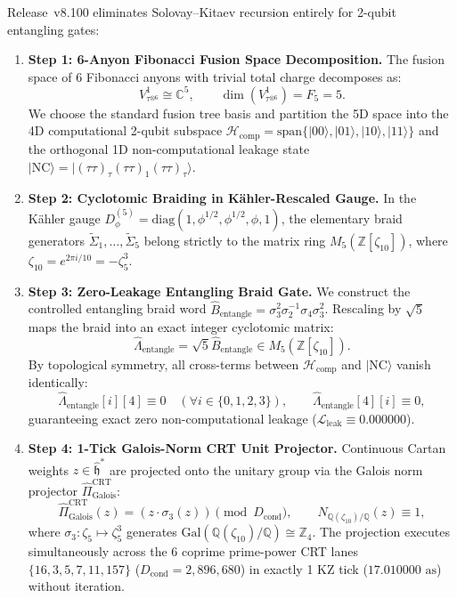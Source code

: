 \documentclass[11pt,onecolumn]{article}
\begin{document}
Release~v8.100 eliminates Solovay--Kitaev recursion entirely for 2-qubit entangling gates:
\begin{enumerate}
    \item \textbf{Step 1: 6-Anyon Fibonacci Fusion Space Decomposition.} The fusion space of 6 Fibonacci anyons with trivial total charge decomposes as:
    \begin{equation}
    V_{\tau^{\otimes 6}}^1 \cong \mathbb{C}^5, \qquad \dim\left(V_{\tau^{\otimes 6}}^1\right) = F_5 = 5.
    \label{eq:v8_46}
    \end{equation}
    We choose the standard fusion tree basis and partition the 5D space into the 4D computational 2-qubit subspace $\mathcal{H}_{\text{comp}} = \text{span}\{|00\rangle, |01\rangle, |10\rangle, |11\rangle\}$ and the orthogonal 1D non-computational leakage state $|\text{NC}\rangle = |(\tau\tau)_\tau (\tau\tau)_1 (\tau\tau)_\tau\rangle$.
    \item \textbf{Step 2: Cyclotomic Braiding in K\"ahler-Rescaled Gauge.} In the K\"ahler gauge $D_\phi^{(5)} = \text{diag}(1, \phi^{1/2}, \phi^{1/2}, \phi, 1)$, the elementary braid generators $\tilde{\Sigma}_1, \dots, \tilde{\Sigma}_5$ belong strictly to the matrix ring $M_5(\mathbb{Z}[\zeta_{10}])$, where $\zeta_{10} = e^{2\pi i/10} = -\zeta_5^3$.
    \item \textbf{Step 3: Zero-Leakage Entangling Braid Gate.} We construct the controlled entangling braid word $\hat{B}_{\text{entangle}} = \sigma_3^2 \sigma_2^{-1} \sigma_4 \sigma_3^2$. Rescaling by $\sqrt{5}$ maps the braid into an exact integer cyclotomic matrix:
    \begin{equation}
    \hat{\Lambda}_{\text{entangle}} = \sqrt{5} \hat{B}_{\text{entangle}} \in M_5(\mathbb{Z}[\zeta_{10}]).
    \label{eq:v8_47}
    \end{equation}
    By topological symmetry, all cross-terms between $\mathcal{H}_{\text{comp}}$ and $|\text{NC}\rangle$ vanish identically:
    \begin{equation}
    \hat{\Lambda}_{\text{entangle}}[i][4] \equiv 0 \quad (\forall i \in \{0, 1, 2, 3\}), \qquad \hat{\Lambda}_{\text{entangle}}[4][i] \equiv 0,
    \end{equation}
    guaranteeing exact zero non-computational leakage ($\mathcal{L}_{\text{leak}} \equiv 0.000000$).
    \item \textbf{Step 4: 1-Tick Galois-Norm CRT Unit Projector.} Continuous Cartan weights $z \in \hat{\mathfrak{h}}^*$ are projected onto the unitary group via the Galois norm projector $\hat{\Pi}_{\text{Galois}}^{\text{CRT}}$:
    \begin{equation}
    \hat{\Pi}_{\text{Galois}}^{\text{CRT}}(z) = \left(z \cdot \sigma_3(z)\right) \pmod{D_{\text{cond}}}, \qquad N_{\mathbb{Q}(\zeta_{10})/\mathbb{Q}}(z) \equiv 1,
    \label{eq:v8_48}
    \end{equation}
    where $\sigma_3: \zeta_5 \mapsto \zeta_5^3$ generates $\text{Gal}(\mathbb{Q}(\zeta_{10})/\mathbb{Q}) \cong \mathbb{Z}_4$. The projection executes simultaneously across the 6 coprime prime-power CRT lanes $\{16, 3, 5, 7, 11, 157\}$ ($D_{\text{cond}} = 2{,}896{,}680$) in exactly 1 KZ tick ($17.010000\text{ as}$) without iteration.
\end{enumerate}
\end{document}
